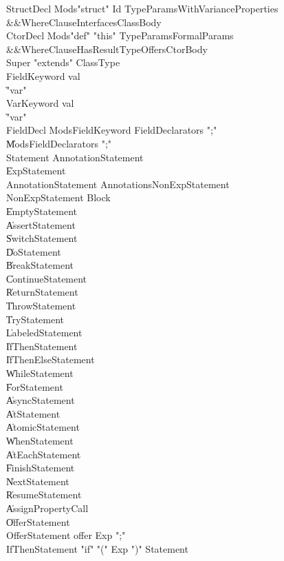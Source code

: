 \begin{grammar}

 StructDecl  \:   Mods\opt  \xcd"struct"  Id  TypeParamsWithVariance\opt  Properties\opt\\
          &&WhereClause\opt  Interfaces\opt  ClassBody\\
 CtorDecl  \:   Mods\opt  \xcd"def"  \xcd"this"  TypeParams\opt  FormalParams\\
          &&WhereClause\opt  HasResultType\opt  Offers\opt  CtorBody\\
 Super  \:   \xcd"extends"  ClassType\\
 FieldKeyword  \:   val\\
    \|   \xcd"var"\\
 VarKeyword  \:   val\\
    \|   \xcd"var"\\
 FieldDecl  \:   Mods\opt  FieldKeyword  FieldDeclarators  \xcd";"\\
    \|   Mods\opt  FieldDeclarators  \xcd";"\\
 Statement  \:   AnnotationStatement\\
    \|   ExpStatement\\
 AnnotationStatement  \:   Annotations\opt  NonExpStatement\\
 NonExpStatement  \:   Block\\
    \|   EmptyStatement\\
    \|   AssertStatement\\
    \|   SwitchStatement\\
    \|   DoStatement\\
    \|   BreakStatement\\
    \|   ContinueStatement\\
    \|   ReturnStatement\\
    \|   ThrowStatement\\
    \|   TryStatement\\
    \|   LabeledStatement\\
    \|   IfThenStatement\\
    \|   IfThenElseStatement\\
    \|   WhileStatement\\
    \|   ForStatement\\
    \|   AsyncStatement\\
    \|   AtStatement\\
    \|   AtomicStatement\\
    \|   WhenStatement\\
    \|   AtEachStatement\\
    \|   FinishStatement\\
    \|   NextStatement\\
    \|   ResumeStatement\\
    \|   AssignPropertyCall\\
    \|   OfferStatement\\
 OfferStatement  \:   offer  Exp  \xcd";"\\
 IfThenStatement  \:   \xcd"if"  \xcd"("  Exp  \xcd")"  Statement\\
\end{grammar}

